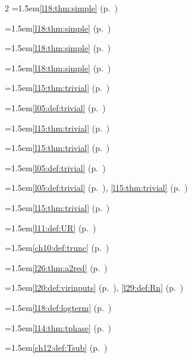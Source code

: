 \begin{multicols}{2}
\hangindent=1.5em\quad \ref{l18:thm:simple} (p.~\pageref{l18:thm:simple})\par
\hangindent=1.5em\quad \ref{l18:thm:simple} (p.~\pageref{l18:thm:simple})\par
\hangindent=1.5em\quad \ref{l18:thm:simple} (p.~\pageref{l18:thm:simple})\par
\hangindent=1.5em\quad \ref{l18:thm:simple} (p.~\pageref{l18:thm:simple})\par
\hangindent=1.5em\quad \ref{l15:thm:trivial} (p.~\pageref{l15:thm:trivial})\par
\hangindent=1.5em\quad \ref{l05:def:trivial} (p.~\pageref{l05:def:trivial})\par
\hangindent=1.5em\quad \ref{l15:thm:trivial} (p.~\pageref{l15:thm:trivial})\par
\hangindent=1.5em\quad \ref{l15:thm:trivial} (p.~\pageref{l15:thm:trivial})\par
\hangindent=1.5em\quad \ref{l05:def:trivial} (p.~\pageref{l05:def:trivial})\par
\hangindent=1.5em\quad \ref{l05:def:trivial} (p.~\pageref{l05:def:trivial}), \ref{l15:thm:trivial} (p.~\pageref{l15:thm:trivial})\par
\hangindent=1.5em\quad \ref{l15:thm:trivial} (p.~\pageref{l15:thm:trivial})\par
\hangindent=1.5em\quad \ref{l11:def:UR} (p.~\pageref{l11:def:UR})\par
\hangindent=1.5em\quad \ref{ch10:def:trunc} (p.~\pageref{ch10:def:trunc})\par
\hangindent=1.5em\quad \ref{l26:thm:a2red} (p.~\pageref{l26:thm:a2red})\par
\hangindent=1.5em\quad \ref{l20:def:virinputs} (p.~\pageref{l20:def:virinputs}), \ref{l29:def:Rn} (p.~\pageref{l29:def:Rn})\par
\hangindent=1.5em\quad \ref{l18:def:logterm} (p.~\pageref{l18:def:logterm})\par
\hangindent=1.5em\quad \ref{l14:thm:tphase} (p.~\pageref{l14:thm:tphase})\par
\hangindent=1.5em\quad \ref{ch12:def:Tsub} (p.~\pageref{ch12:def:Tsub})\par

\end{multicols}
